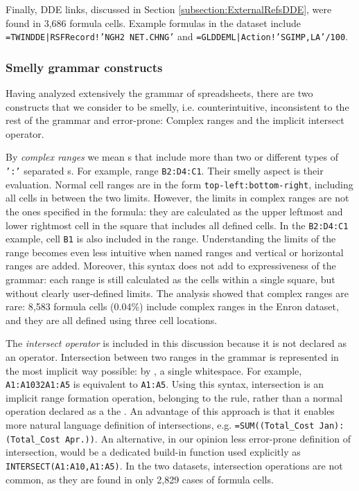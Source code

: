 \documentclass[conference]{IEEEtran}
\begin{document}
Finally, DDE links, discussed in Section \ref{subsection:ExternalRefsDDE}, were found in 3,686 formula cells. Example formulas in the dataset include \texttt{=TWINDDE|RSFRecord!'NGH2 NET.CHNG'} and \texttt{=GLDDEML|Action!'SGIMP,LA'/100}.

\subsubsection{Smelly grammar constructs}
Having analyzed extensively the grammar of spreadsheets, there are two constructs that we consider to be smelly, i.e. counterintuitive, inconsistent to the rest of the grammar and error-prone: Complex ranges and the implicit intersect operator.

By \textit{complex ranges} we mean s that include more than two or different types of \texttt{':'} separated s. For example, range \texttt{B2:D4:C1}. Their smelly aspect is their evaluation. Normal cell ranges are in the form \texttt{top-left:bottom-right}, including all cells in between the two limits. However, the limits in complex ranges are not the ones specified in the formula: they are calculated as the upper leftmost and lower rightmost cell in the square that includes all defined cells. In the \texttt{B2:D4:C1} example, cell \texttt{B1} is also included in the range. Understanding the limits of the range becomes even less intuitive when named ranges and vertical or horizontal ranges are added. Moreover, this syntax does not add to expressiveness of the grammar: each range is still calculated as the cells within a single square, but without clearly user-defined limits. The analysis showed that complex ranges are rare: 8,583 formula cells	(0.04\%) include complex ranges in the Enron dataset, and they are all defined using three cell locations. 

The \textit{intersect operator} is included in this discussion because it is not declared as an operator. Intersection between two ranges in the grammar is represented in the most implicit way possible: by \texttt{}, a single whitespace. For example, \texttt{A1:A10\char32A1:A5} is equivalent to \texttt{A1:A5}. Using this syntax, intersection is an implicit range formation operation, belonging to the  rule, rather than a normal operation declared as a the . An advantage of this approach is that it enables more natural language definition of intersections, e.g. \texttt{=SUM((Total_Cost Jan):(Total_Cost Apr.))}. An alternative, in our opinion less error-prone definition of intersection, would be a dedicated build-in function used explicitly as \texttt{INTERSECT(A1:A10,A1:A5)}. In the two datasets, intersection operations are not common, as they are found in only 2,829 cases of formula cells.
\end{document}
